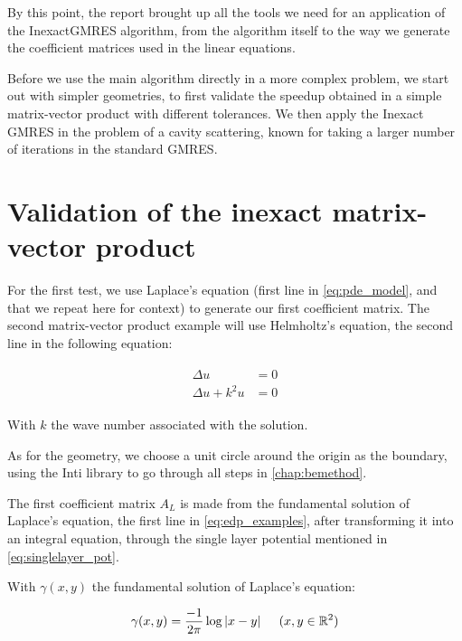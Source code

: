 
By this point, the report brought up all the tools we need for an application of the InexactGMRES algorithm, from the algorithm itself to the way we generate the coefficient matrices used in the linear equations.

Before we use the main algorithm directly in a more complex problem, we start out with simpler geometries, to first validate the speedup obtained in a simple matrix-vector product with different tolerances. We then apply the Inexact GMRES in the problem of a cavity scattering, known for taking a larger number of iterations in the standard GMRES.

\section{Validation of the inexact matrix-vector product}

For the first test, we use Laplace's equation (first line in \ref{eq:pde_model}, and that we repeat here for context) to generate our first coefficient matrix. The second matrix-vector product example will use Helmholtz's equation, the second line in the following equation:

\begin{align}\label{eq:edp_examples}
    \begin{split}
        \Delta u &= 0\\
        \Delta u + k^{2}u &=0
    \end{split}
\end{align}

With $k$ the wave number associated with the solution.

As for the geometry, we choose a unit circle around the origin as the boundary, using the Inti library \cite{git-inti} to go through all steps in \autoref{chap:bemethod}.


The first coefficient matrix $A_{L}$ is made from the fundamental solution of Laplace's equation, the first line in \autoref{eq:edp_examples}, after transforming it into an integral equation, through the single layer potential mentioned in \autoref{eq:singlelayer_pot}.

With $\gamma(x,y)$ the fundamental solution of Laplace's equation:

\begin{equation}
    \gamma (x,y) = \frac{-1}{2\pi} \log |x-y| \hspace{0.2in} (x,y \in \mathbb{R}^{2})
\end{equation}

